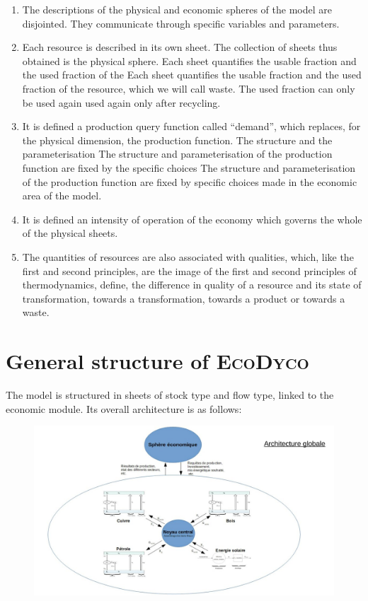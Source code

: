 \documentclass[12pt,a4paper]{article}%
\newcommand{\ed}{\textsc{EcoDyco}}
\begin{document}
\begin{enumerate}
	\item The descriptions of the physical and economic spheres of the model
	are disjointed. They communicate through specific variables and parameters. 
	
	\item Each resource is described in its own sheet. The collection of sheets thus obtained is the physical sphere. Each sheet quantifies the usable fraction and the used fraction of the
	Each sheet quantifies the usable fraction and the used fraction of the resource, which we will call waste. The used fraction can only be used again
	used again only after recycling.
	
	\item It is defined a production query function called ``demand'', which
	replaces, for the physical dimension, the production function. The structure and the parameterisation 
	The structure and parameterisation of the production function are fixed by the specific choices
	The structure and parameterisation of the production function are fixed by specific choices made in the economic area of the model.
	
	\item It is defined an intensity of operation of the economy which governs
	the whole of the physical sheets.
	
	\item The quantities of resources are also associated with qualities, which, like the first and second principles, are
	the image of the first and second principles of thermodynamics, define,
	the difference in quality of a resource and its state of transformation, towards a
	transformation, towards a product or towards a waste.
\end{enumerate}


\section{General structure of \ed}

The model is structured in sheets of stock type and flow type,
linked to the economic module. Its overall architecture is as follows:


\begin{figure}[h]
\centering \includegraphics[width=1.0\textwidth]{figures/Archiglobale.jpg}\end{figure}
\end{document}
